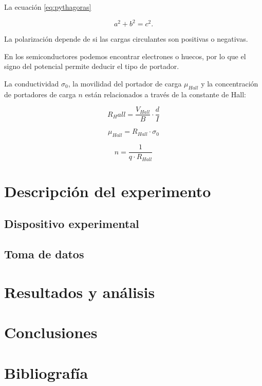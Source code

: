 La ecuación \eqref{eq:pythagoras}

\begin{equation}
a^2 + b^2 = c^2 .
\end{equation}


La polarización depende de si las cargas circulantes son positivas o negativas.

En los semiconductores podemos encontrar electrones o huecos, por lo que el signo del potencial permite deducir el tipo de portador. 

La conductividad $\sigma_0$, la movilidad del portador de carga $\mu_{Hall}$ y la concentración de portadores de carga $n$ están relacionados a través de la constante de Hall:

\[ R_Hall = \frac{V_{Hall}}{B} \cdot \frac{d}{I}
\]

\[ \mu_{Hall} = R_{Hall}\cdot \sigma_0
\]

\[ n = \frac{1}{q\cdot R_{Hall}}
\]



\section{Descripción del experimento}

\subsection{Dispositivo experimental}
\subsection{Toma de datos}

\section{Resultados y análisis}

\section{Conclusiones}


\section{Bibliografía}






